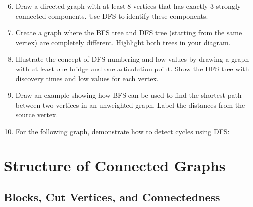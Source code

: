 \documentclass{article}
\theoremstyle{definition}
\begin{document}
\begin{enumerate}\setcounter{enumi}{5}
\item Draw a directed graph with at least 8 vertices that has exactly 3 strongly connected components. Use DFS to identify these components.

\item Create a graph where the BFS tree and DFS tree (starting from the same vertex) are completely different. Highlight both trees in your diagram.

\item Illustrate the concept of DFS numbering and low values by drawing a graph with at least one bridge and one articulation point. Show the DFS tree with discovery times and low values for each vertex.

\item Draw an example showing how BFS can be used to find the shortest path between two vertices in an unweighted graph. Label the distances from the source vertex.

\item For the following graph, demonstrate how to detect cycles using DFS:
\begin{center}
\end{center}
\end{enumerate}


\pagebreak
\newpage



\section{Structure of Connected Graphs}

\subsection{Blocks, Cut Vertices, and Connectedness}
\end{document}
